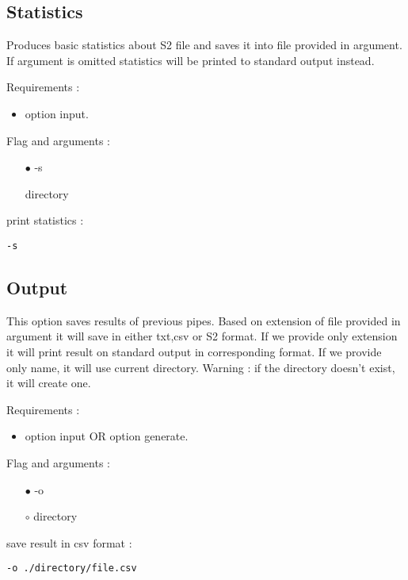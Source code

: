 \documentclass[english]{article}
\begin{document}
\subsection{Statistics}
Produces basic statistics about S2 file and saves it into file provided in argument. If argument is omitted statistics will be printed to standard output instead.

\noindent Requirements : 
\begin{itemize}
\item option input. 
\end{itemize}
Flag and arguments :
\begin{itemize}
\item[$\bullet$] -s
\item[\textasteriskcentered] directory
\end{itemize}
print statistics : 
\begin{lstlisting} 
-s
\end{lstlisting}


\subsection{Output}
This option saves results of previous pipes. Based on extension of file provided in argument it will save in either txt,csv or S2 format. If we provide only extension it will print result on standard output in corresponding format. If we provide only name, it will use current directory. Warning : if the directory doesn't exist, it will create one.

\noindent Requirements : 
\begin{itemize}
\item option input OR option generate. 
\end{itemize}
Flag and arguments :
\begin{itemize}
\item[$\bullet$] -o
\item[$\circ$] directory
\end{itemize}
save result in csv format : 
\begin{lstlisting} 
-o ./directory/file.csv
\end{lstlisting}
\end{document}
